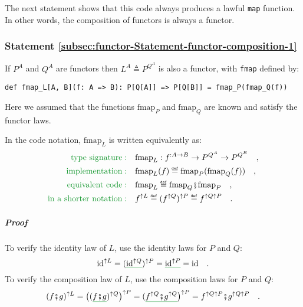 The next statement shows that this code always produces a lawful \lstinline!map!
function. In other words, the composition
of functors is always a functor.

\subsubsection{Statement \label{subsec:functor-Statement-functor-composition-1}\ref{subsec:functor-Statement-functor-composition-1}}

If $P^{A}$ and $Q^{A}$ are functors then $L^{A}\triangleq P^{Q^{A}}$
is also a functor, with \lstinline!fmap! defined by:
\begin{lstlisting}
def fmap_L[A, B](f: A => B): P[Q[A]] => P[Q[B]] = fmap_P(fmap_Q(f))
\end{lstlisting}
Here we assumed that the functions $\text{fmap}_{P}$ and $\text{fmap}_{Q}$
are known and satisfy the functor laws.

In the code notation, $\text{fmap}_{L}$ is written equivalently as:
\begin{align}
{\color{greenunder}\text{type signature}:}\quad & \text{fmap}_{L}:f^{:A\rightarrow B}\rightarrow P^{Q^{A}}\rightarrow P^{Q^{B}}\quad,\nonumber \\
{\color{greenunder}\text{implementation}:}\quad & \text{fmap}_{L}(f)\triangleq\text{fmap}_{P}(\text{fmap}_{Q}(f))\quad,\nonumber \\
{\color{greenunder}\text{equivalent code}:}\quad & \text{fmap}_{L}\triangleq\text{fmap}_{Q}\bef\text{fmap}_{P}\quad,\\
{\color{greenunder}\text{in a shorter notation}:}\quad & f^{\uparrow L}\triangleq(f^{\uparrow Q})^{\uparrow P}\triangleq f^{\uparrow Q\uparrow P}\quad.\label{eq:def-functor-composition-fmap}
\end{align}


\subparagraph{Proof}

To verify the identity law of $L$, use the identity laws for $P$
and $Q$:
\[
\text{id}^{\uparrow L}=(\gunderline{\text{id}^{\uparrow Q}})^{\uparrow P}=\gunderline{\text{id}^{\uparrow P}}=\text{id}\quad.
\]
To verify the composition law of $L$, use the composition laws for
$P$ and $Q$:
\[
(f\bef g)^{\uparrow L}=\big((\gunderline{f\bef g})^{\uparrow Q}\big)^{\uparrow P}=(\gunderline{f^{\uparrow Q}\bef g^{\uparrow Q}}\big)^{\uparrow P}=f^{\uparrow Q\uparrow P}\bef g^{\uparrow Q\uparrow P}\quad.
\]

